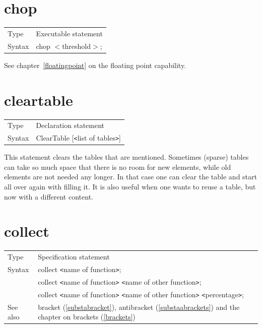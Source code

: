 \section{chop}
\label{substachop}

\noindent \begin{tabular}{ll}
Type & Executable statement\\
Syntax & chop $<$threshold$>$; \\ 
\end{tabular} \vspace{4mm}

\noindent See chapter~\ref{floatingpoint} on the floating point capability.
 

\section{cleartable}
\label{substacleartable}

\noindent \begin{tabular}{ll}
Type & Declaration statement\\
Syntax & ClearTable [{\tt<}list of tables{\tt>}]
\end{tabular} \vspace{4mm}

\noindent This statement clears the tables that are mentioned. Sometimes 
(sparse) tables can take so much space that there is no room for new 
elements, while old elements are not needed any longer. In that case one 
can clear the table and start all over again with filling it. It is also 
useful when one wants to reuse a table, but now with a different content.
\vspace{10mm}


\section{collect}
\label{substacollect}

\noindent \begin{tabular}{ll}
Type & Specification statement\\
Syntax & collect {\tt<}name of function{\tt>}; \\
       & collect {\tt<}name of function{\tt>} 
        {\tt<}name of other function{\tt>}; \\
       & collect {\tt<}name of function{\tt>} 
        {\tt<}name of other function{\tt>} {\tt<}percentage{\tt>};
\\ See also & bracket (\ref{substabracket}), antibracket 
     (\ref{substaabrackets}) and the chapter on brackets 
     (\ref{brackets})
\end{tabular} \vspace{4mm}

